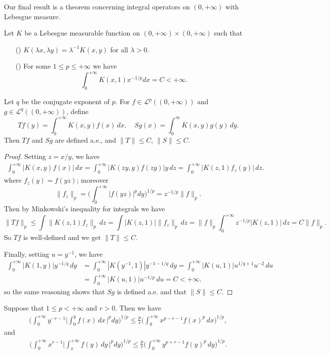 Our final result is a theorem concerning integral operators on $(0,+\infty)$ with Lebesgue measure.
\begin{theorem}\label{L^p anti-homogeneous function operator}
Let $K$ be a Lebesgue measurable function on $(0,+\infty)\times(0,+\infty)$ such that
\begin{itemize}
\item[(\rmnum{1})] $K(\lambda x,\lambda y)=\lambda^{-1}K(x,y)$ for all $\lambda>0$.
\item[(\rmnum{2})] For some $1\leq p\leq+\infty$ we have
\[\int_{0}^{+\infty}K(x,1)x^{-1/p}dx=C<+\infty.\] 
\end{itemize}
Let $q$ be the conjugate exponent of $p$. For $f\in\mathcal{L}^p((0,+\infty))$ and $g\in\mathcal{L}^q((0,+\infty))$, define
\[Tf(y)=\int_{0}^{+\infty}K(x,y)f(x)\,dx,\quad Sg(x)=\int_{0}^{\infty}K(x,y)g(y)\,dy.\]
Then $Tf$ and $Sg$ are defined a.e., and $\|T\|\leq C$, $\|S\|\leq C$.
\end{theorem}
\begin{proof}
Setting $z=x/y$, we have
\begin{align*}
\int_{0}^{+\infty}|K(x,y)f(x)|\,dx=\int_{0}^{+\infty}|K(zy,y)f(zy)|y\,dz=\int_{0}^{+\infty}|K(z,1)f_z(y)|\,dz.
\end{align*}
where $f_z(y)=f(yz)$; moreover
\[\|f_z\|_p=\Big(\int_{0}^{+\infty}|f(yz)|^pdy\Big)^{1/p}=z^{-1/p}\|f\|_p.\]
Then by Minkowski's inequality for integrals we have
\[\|Tf\|_p\leq\int\|K(z,1)f_z\|_p\,dz=\int|K(z,1)|\|f_z\|_p\,dz=\|f\|_p\int_{0}^{+\infty}z^{-1/p}|K(z,1)|\,dz=C\|f\|_p.\]
So $Tf$ is well-defined and we get $\|T\|\leq C$.\par
Finally, setting $u=y^{-1}$, we have
\begin{align*}
\int_{0}^{+\infty}|K(1,y)|y^{-1/q}\,dy&=\int_{0}^{+\infty}|K(y^{-1},1)|y^{-1-1/q}\,dy=\int_{0}^{+\infty}|K(u,1)|u^{1/q+1}u^{-2}\,du\\
&=\int_{0}^{+\infty}|K(u,1)|u^{-1/p}\,du=C<+\infty.
\end{align*}
so the same reasoning shows that $Sg$ is defined a.e. and that $\|S\|\leq C$.
\end{proof}
\begin{corollary}
Suppose that $1\leq p<+\infty$ and $r>0$. Then we have
\begin{align*}
\Big(\int_{0}^{+\infty}y^{-r-1}\Big|\int_0^yf(x)\,dx\,\Big|^pdy\Big)^{1/p}\leq\frac{p}{r}\Big(\int_{0}^{+\infty}x^{p-r-1}f(x)^p\,dx)^{1/p},
\end{align*}
and
\begin{align*}
\Big(\int_{0}^{+\infty}x^{r-1}\Big|\int_{x}^{+\infty}f(y)\,dy\,\Big|^pdy\Big)^{1/p}\leq\frac{p}{r}\Big(\int_{0}^{+\infty}y^{p+r-1}f(y)^p\,dy\Big)^{1/p}.
\end{align*}
\end{corollary}
